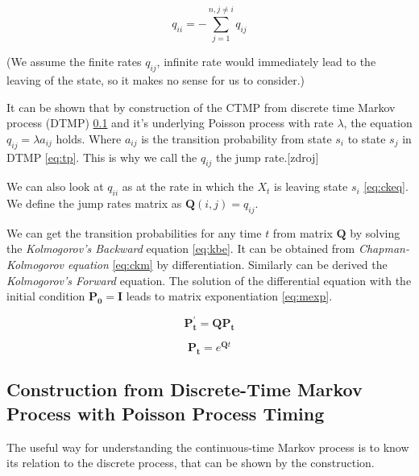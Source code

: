 \documentclass[thesis=M,english]{FITthesis}[2012/10/20]
\newcommand{\matr}[1]{\mathbf{#1}}
\begin{document}
\begin{equation}\label{eq:qii}
 q_{ii} =  - \sum_{j = 1}^{ n ,j \neq i} q_{ij} 
\end{equation}

(We assume the finite rates $q_{ij}$, infinite rate would immediately lead to the leaving of the state, so it makes no sense for us to consider.)

It can be shown that by construction of the CTMP from discrete time Markov process (DTMP) \ref{sec:constr}  and  it's underlying Poisson process with rate $\lambda$, the equation $q_{ij} = \lambda a_{ij}$ holds. Where $a_{ij}$ is the transition probability from state $s_i$ to state $s_j$ in DTMP \ref{eq:tp}. This is why we call the $q_{ij}$ the jump rate.[zdroj] %


We can also look at $q_{ii}$ as at the rate in which the $X_t$ is leaving state $s_i$ \eqref{eq:ckeq}. We define the jump rates matrix as $\matr{Q}(i,j) = q_{ij}$.

We can get the transition probabilities for any time $t$ from matrix $\matr{Q}$ by solving the \textit{Kolmogorov's Backward} equation \eqref{eq:kbe}. It can be obtained from \textit{Chapman-Kolmogorov equation} \eqref{eq:ckm} by differentiation. Similarly can be derived the \textit{Kolmogorov's Forward} equation. The solution of the differential equation with the initial condition $\matr{P_0} = \matr{I}$ leads to matrix exponentiation \eqref{eq:mexp}. %

\begin{equation}\label{eq:kbe}
\matr{P_t^{'}} = \matr{Q} \matr{P_{t}}
\end{equation}

\begin{equation}\label{eq:mexp}
\matr{P_{t}} = e^{\matr{Q}t}  
\end{equation}


\subsection{Construction from Discrete-Time Markov Process with Poisson Process Timing }\label{sec:constr} 

The useful way for understanding the continuous-time Markov process is to know its relation to the discrete process, that can be shown by the construction.
\end{document}
